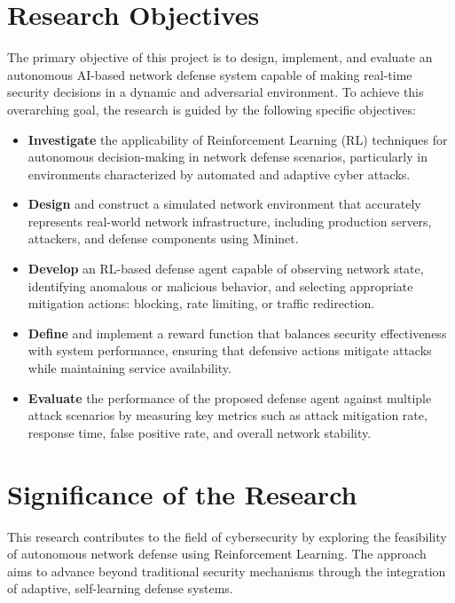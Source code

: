 \documentclass[12pt,a4paper]{report}
\begin{document}
\section{Research Objectives}

The primary objective of this project is to design, implement, and evaluate an autonomous AI-based network defense system capable of making real-time security decisions in a dynamic and adversarial environment. To achieve this overarching goal, the research is guided by the following specific objectives:

\begin{itemize}
  \item \textbf{Investigate} the applicability of Reinforcement Learning (RL) techniques for autonomous decision-making in network defense scenarios, particularly in environments characterized by automated and adaptive cyber attacks.
  \item \textbf{Design} and construct a simulated network environment that accurately represents real-world network infrastructure, including production servers, attackers, and defense components using Mininet.
  \item \textbf{Develop} an RL-based defense agent capable of observing network state, identifying anomalous or malicious behavior, and selecting appropriate mitigation actions: blocking, rate limiting, or traffic redirection.
  \item \textbf{Define} and implement a reward function that balances security effectiveness with system performance, ensuring that defensive actions mitigate attacks while maintaining service availability.
  \item \textbf{Evaluate} the performance of the proposed defense agent against multiple attack scenarios by measuring key metrics such as attack mitigation rate, response time, false positive rate, and overall network stability.
\end{itemize}

\section{Significance of the Research}

This research contributes to the field of cybersecurity by exploring the feasibility of autonomous network defense using Reinforcement Learning. The approach aims to advance beyond traditional security mechanisms through the integration of adaptive, self-learning defense systems.
\end{document}
